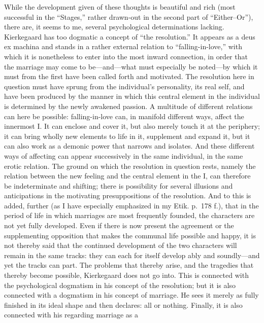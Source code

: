 \documentclass[12pt,a4paper]{book}
\newcommand{\opage}[1]{\marginnote{\footnotesize\textit{[#1]}}}
\begin{document}
While the development given of these thoughts is beautiful and rich (most
successful in the ``Stages,'' rather drawn-out in the second part of
``Either--Or''), there are, it seems to me, several psychological
determinations lacking. Kierkegaard has too dogmatic a concept of ``the
resolution.'' It appears as a deus ex machina and stands in a rather
external relation to ``falling-in-love,'' with which it is nonetheless to
enter into the most inward connection, in order that the marriage may come
to be---and---what must especially be noted---by which it must from the
first have been called forth and motivated. The resolution here in
question must have sprung from the individual's personality, its real
self, and have been produced by the manner in which this central element in
the individual is determined by the newly awakened passion. A multitude of
different relations can here be possible: falling-in-love can, in manifold
different ways, affect the innermost I. It can enclose and cover it, but
also merely touch it at the periphery; it can bring wholly new elements to
life in it, supplement and expand it, but it can also work as a demonic
power that narrows and isolates. And these different ways of affecting can
appear successively in the same individual, in the same erotic relation.
The ground on which the resolution in question rests, namely the relation
between the new feeling and the central element in the I, can therefore be
indeterminate and shifting; there is possibility for several illusions and
anticipations in the motivating presuppositions of the resolution. And to
this
\opage{94}is added, further (as I have especially emphasized in my Etik.
p.~178 f.), that in the period of life in which marriages are most
frequently founded, the characters are not yet fully developed. Even if
there is now present the agreement or the supplementing opposition that
makes the communal life possible and happy, it is not thereby said that
the continued development of the two characters will remain in the same
tracks: they can each for itself develop ably and soundly---and yet the
tracks can part. The problems that thereby arise, and the tragedies that
thereby become possible, Kierkegaard does not go into. This is connected
with the psychological dogmatism in his concept of the resolution; but it
is also connected with a dogmatism in his concept of marriage. He sees it
merely as fully finished in its ideal shape and then declares: all or
nothing. Finally, it is also connected with his regarding marriage as a
\end{document}
